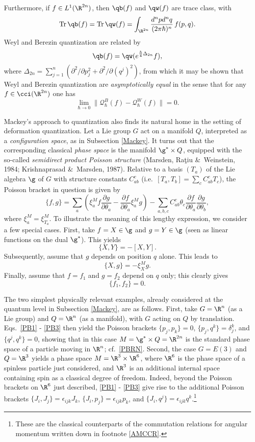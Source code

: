 \documentclass[12pt,titlepage]{article}
\newcommand{\beq}{\begin{equation}}
\newcommand{\eeq}{\end{equation}}
\newcommand{\x}{\times} \newcommand{\hb}{\hbar}
\newcommand{\Tr}{\mbox{\rm Tr}\,} \newcommand{\Ad}{{\rm Ad}}
\newcommand{\qh}{q_{\hbar}} \newcommand{\sgh}{\sigma_{\hbar}}
\newcommand{\er}{\eqref}
\newcommand{\dl}{\delta} \newcommand{\Dl}{\Delta}
\newcommand{\ep}{\epsilon} \newcommand{\varep}{\varepsilon}
\newcommand{\CQ}{{\mathcal Q}} \newcommand{\CR}{{\mathcal R}}
\renewcommand{\qh}{\CQ_{\hbar}}
\begin{document}
Furthermore, if $f\in L^1(\R^{2n})$, then $\qb(f)$ and $\qw(f)$ are trace class, with
\beq
\Tr \qb(f)=\Tr \qw(f)=\int_{\R^{2n}}
 \frac{d^npd^nq}{(2\pi\hbar)^n}\, f(p,q).\eeq
 Weyl and  Berezin quantization are related by 
  \beq
  \qb(f)=\qw(e^{\frac{\hbar}{4}\Delta_{2n}}f),
  \eeq
  where $\Delta_{2n}=\sum_{j=1}^n (\partial^2/\partial p_j^2 + \partial^2/\partial (q^j)^2)$, from which it may be shown that Weyl and Berezin  quantization
 are {\it asymptotically equal} in the sense that  for any $f\in \cci(\R^{2n})$ one has 
 \beq \lim_{\hbar\rightarrow 0} \|\qh^B(f)-\qh^W(f)\|=0. \label{WBEQ}\eeq

 Mackey's approach to quantization also finds its natural home in the setting of deformation quantization. Let a Lie group $G$ act on a manifold $Q$,  interpreted as a {\it configuration space}, as in  Subsection \ref{Mackey}.  It turns out that the corresponding classical {\it phase space} is the manifold $\g^*\times Q$, equipped with  the so-called {\it semidirect product  Poisson structure}  (Marsden,  Ra\c tiu \&\  Weinstein, 1984; Krishnaprasad \&\ Marsden,  1987).   Relative to a basis $(T_a)$ of the Lie algebra $\g$ of $G$ with structure constants $C_{ab}^c$ (i.e.\ $[T_a,T_b]=\sum_c C_{ab}^cT_c$), the Poisson bracket in question is given by \beq \{f,g\} =  \sum_a\left(\xi^M_a f \frac{\partial g}{\partial\theta_a} -
\frac{\partial f}{\partial\theta_a}\xi^M_a g\right)-\sum_{a,b,c} C_{ab}^c
\theta_c \frac{\partial f}{\partial\theta_a} \frac{\partial
g}{\partial\theta_b},\eeq
where $\xi_a^M=\xi_{T_a}^M$. To illustrate the meaning of this lengthy expression, we consider a few  special
cases. First, take  $f=X\in\g$ and $g=Y\in\g$  (seen as linear functions on the dual $\g^*$). This yields
\beq \{X,Y\}=-[X,Y]. \label{PB1}\eeq
Subsequently, assume that  $g$ depends on position $q$ alone.
This leads to
\beq \{X,g\}=-\xi^M_X g. \label{PB2} \eeq Finally, assume that
 $f=f_1$ and $g=f_2$ depend on $q$ only; this clearly gives
\beq \{f_1,f_2\}=0. \label{PB3}\eeq   

The two simplest physically relevant examples, already considered at the quantum level in Subsection \ref{Mackey}, are as follows. First,  take $G=\R^n$ (as a  Lie group) and $Q=\R^n$ (as a manifold), with $G$ acting on $Q$ by translation. Eqs.\ \er{PB1} - \er{PB3} then yield the Poisson brackets $\{p_j,p_k\}=0$, $\{p_j,q^k\}=\dl_j^k$, and $\{q^j,q^k\}=0$, showing that in this case $M=\g^*\x Q=\R^{2n}$ is the standard phase space of a particle moving in $\R^n$; cf.\ \er{PBRN}.  Second, the case $G=E(3)$ and $Q=\R^3$ yields a phase space
$M=\R^3\x\R^6$, where $\R^6$ is the phase space of a spinless particle just considered, and $\R^3$ is an additional internal space containing spin as a classical degree of freedom. Indeed, beyond the Poisson brackets on $\R^6$ just described, \er{PB1} - \er{PB3} give rise to the additional  Poisson brackets $\{J_i,J_j\}=\ep_{ijk}J_k$, $\{J_i,p_j\}=\ep_{ijk}p_k$, and $\{J_i,q^j\}=\ep_{ijk}q^k$.\footnote{These are the classical counterparts of the 
  commutation relations for angular momentum  written down in footnote  \ref{AMCCR}.}
\end{document}
